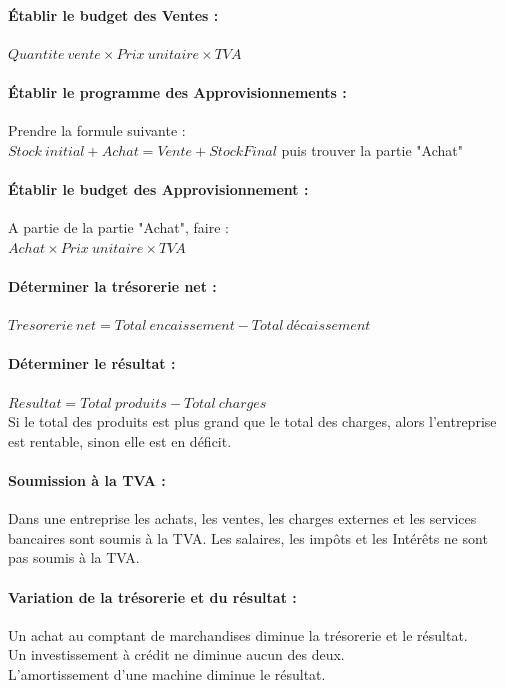 \documentclass{report}
\begin{document}
\paragraph*{Établir le budget des Ventes :}
$ Quantite \ vente \times Prix\ unitaire \times TVA$

\paragraph*{Établir le programme des Approvisionnements :}
Prendre la formule suivante : 
\\ $Stock\ initial + Achat = Vente + Stock Final$ puis trouver la partie "Achat"

\paragraph*{Établir le budget des Approvisionnement :}
A partie de la partie "Achat", faire : 
\\$Achat \times Prix\ unitaire \times  TVA$

\paragraph*{Déterminer la trésorerie net :}
$Tresorerie\ net = Total\ encaissement - Total\ décaissement$

\paragraph*{Déterminer le résultat :} 
$Resultat = Total\ produits - Total\ charges$
\\Si le total des produits est plus grand que le total des charges, alors l'entreprise est rentable, sinon elle est en déficit.

\paragraph*{Soumission à la TVA :}
Dans une entreprise les achats, les ventes, les charges externes et les services bancaires sont soumis à la TVA. Les salaires, les impôts et les Intérêts ne sont pas soumis à la TVA.

\paragraph*{Variation de la trésorerie et du résultat :}
Un achat au comptant de marchandises diminue la trésorerie et le résultat.
\\ Un investissement à crédit ne diminue aucun des deux.
\\ L'amortissement d'une machine diminue le résultat.
\end{document}
